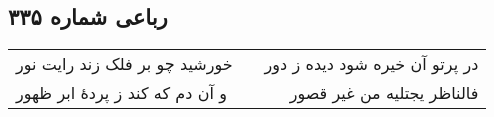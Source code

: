 \begin{center}
\section*{رباعی شماره ۳۳۵}
\label{sec:sh335}
\begin{longtable}{l p{0.5cm} r}
خورشید چو بر فلک زند رایت نور
&&
در پرتو آن خیره شود دیده ز دور
\\
و آن دم که کند ز پردهٔ ابر ظهور
&&
فالناظر یجتلیه من غیر قصور
\\
\end{longtable}
\end{center}
